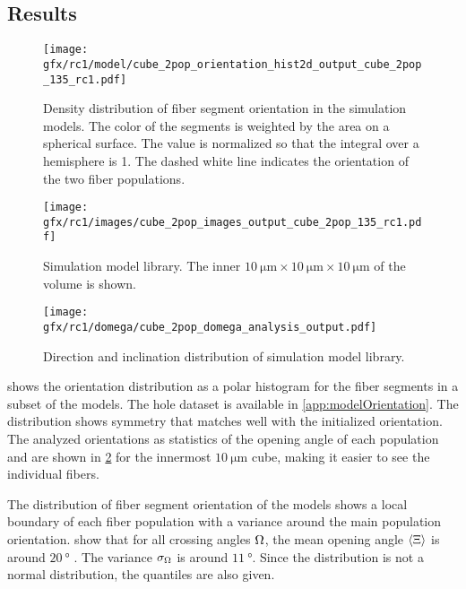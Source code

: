 \subsection{Results}
%
\begin{figure}[!t]
\centering
\texttt{[image: gfx/rc1/model/cube\_2pop\_orientation\_hist2d\_output\_cube\_2pop\_135\_rc1.pdf]}
\caption{Density distribution of fiber segment orientation in the simulation models. The color of the segments is weighted by the area on a spherical surface. The value is normalized so that the integral over a hemisphere is 1. The dashed white line indicates the orientation of the two fiber populations.}
\label{fig:modelOrientation}
\end{figure}
%
\begin{figure}[!t]
\centering
\texttt{[image: gfx/rc1/images/cube\_2pop\_images\_output\_cube\_2pop\_135\_rc1.pdf]}
\caption[solved model images]{Simulation model library. The inner $\SI{10}{\micro\meter} \times \SI{10}{\micro\meter} \times \SI{10}{\micro\meter}$ of the volume is shown.}
\label{fig:modelImages}
\end{figure}
%
\begin{figure}[!t]
    \centering
    \texttt{[image: gfx/rc1/domega/cube\_2pop\_domega\_analysis\_output.pdf]}
    \caption{Direction and inclination distribution of simulation model library. }
\end{figure}
%
 shows the orientation distribution as a polar histogram for the fiber segments in a subset of the models.
The hole dataset is available in \cref{app:modelOrientation}.
The distribution shows symmetry that matches well with the initialized orientation.
The analyzed orientations as statistics of the opening angle \openingAngle{} of each population \popa{} and \popb{} are shown in \cref{fig:modelImages} for the innermost $\SI{10}{\micro\meter}$ cube, making it easier to see the individual fibers.
\par
%
The distribution of fiber segment orientation of the models shows a local boundary of each fiber population with a variance around the main population orientation.
 show that for all crossing angles $\textnormal{$\Omega$}$, the mean opening angle $\langle \textnormal{$\Xi$}
 \rangle$ is around $\SI{20}{\degree}$ .
The variance $\sigma_{\textnormal{$\Omega$}}$ is around $\SI{11}{\degree}$.
Since the distribution is not a normal distribution, the quantiles are also given.
